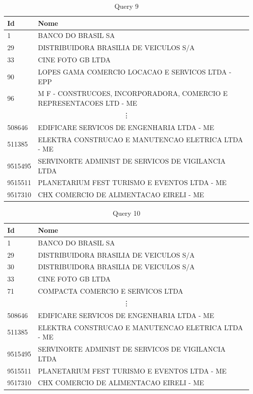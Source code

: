 \documentclass{article}
\begin{document}
\begin{table}[H]
  \centering
  \begin{tabular}{ll}
    Id & Nome \\
    \midrule
    1  & BANCO DO BRASIL SA \\
    29 & DISTRIBUIDORA BRASILIA DE VEICULOS S/A \\
    33 & CINE FOTO GB LTDA \\
    90 & LOPES GAMA COMERCIO LOCACAO E SERVICOS LTDA - EPP \\
    96 & M F - CONSTRUCOES, INCORPORADORA, COMERCIO E REPRESENTACOES LTD - ME \\
    \multicolumn{2}{c}{\vdots} \\
    508646  & EDIFICARE SERVICOS DE ENGENHARIA LTDA - ME \\
    511385  & ELEKTRA CONSTRUCAO E MANUTENCAO ELETRICA LTDA  - ME \\
    9515495 & SERVINORTE ADMINIST DE SERVICOS DE VIGILANCIA LTDA \\
    9515511 & PLANETARIUM FEST TURISMO E EVENTOS LTDA - ME \\
    9517310 & CHX COMERCIO DE ALIMENTACAO EIRELI - ME \\
    \bottomrule
  \end{tabular}
  \caption*{Query 9}
\end{table}

\begin{table}[H]
  \centering
  \begin{tabular}{ll}
    Id & Nome \\
    \midrule
    1  & BANCO DO BRASIL SA \\
    29 & DISTRIBUIDORA BRASILIA DE VEICULOS S/A \\
    30 & DISTRIBUIDORA BRASILIA DE VEICULOS S/A \\
    33 & CINE FOTO GB LTDA \\
    71 & COMPACTA COMERCIO E SERVICOS LTDA \\
    \multicolumn{2}{c}{\vdots} \\
    508646  & EDIFICARE SERVICOS DE ENGENHARIA LTDA - ME \\
    511385  & ELEKTRA CONSTRUCAO E MANUTENCAO ELETRICA LTDA  - ME \\
    9515495 & SERVINORTE ADMINIST DE SERVICOS DE VIGILANCIA LTDA \\
    9515511 & PLANETARIUM FEST TURISMO E EVENTOS LTDA - ME \\
    9517310 & CHX COMERCIO DE ALIMENTACAO EIRELI - ME \\
    \bottomrule
  \end{tabular}
  \caption*{Query 10}
\end{table}
\end{document}
